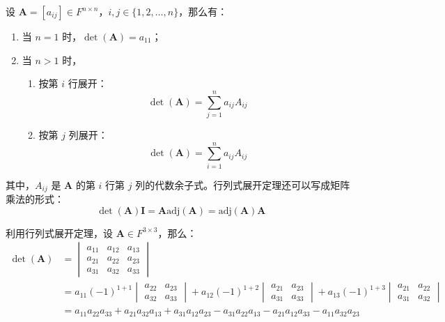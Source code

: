 \begin{theorem}[行列式展开定理]
    设 $\mathbf{A} = [a_{ij}] \in F^{n \times n}$，$i,j\in\{1,2,\ldots,n\}$，那么有：
    \begin{enumerate}
        \item 当 $n=1$ 时，$\det(\mathbf{A}) = a_{11}$；
        \item 当 $n>1$ 时，
        \begin{enumerate}
            \item 按第 $i$ 行展开：
            \[
                \det(\mathbf{A}) = \sum_{j=1}^{n} a_{ij} A_{ij}
            \]
            \item 按第 $j$ 列展开：
            \[
                \det(\mathbf{A}) = \sum_{i=1}^{n} a_{ij} A_{ij}
            \]
        \end{enumerate}
    \end{enumerate}
    其中，$A_{ij}$ 是 $\mathbf{A}$ 的第 $i$ 行第 $j$ 列的代数余子式。行列式展开定理还可以写成矩阵乘法的形式：
    \[
        \det(\mathbf{A}) \mathbf{I} = \mathbf{A}\mathrm{adj}(\mathbf{A})= \mathrm{adj}(\mathbf{A})\mathbf{A}
    \]
    \label{thm:determinant_expansion}
\end{theorem}

\begin{example}
    利用行列式展开定理，设 $\mathbf{A}\in F^{3\times 3}$，那么：
    \begin{align*}
        \det(\mathbf{A}) &= \begin{vmatrix}
            a_{11} & a_{12} & a_{13} \\
            a_{21} & a_{22} & a_{23} \\
            a_{31} & a_{32} & a_{33}
        \end{vmatrix}\\
        &= a_{11} (-1)^{1+1}\begin{vmatrix}
                a_{22} & a_{23} \\
                a_{32} & a_{33}
            \end{vmatrix} +
            a_{12} (-1)^{1+2}\begin{vmatrix}
                a_{21} & a_{23} \\
                a_{31} & a_{33}
            \end{vmatrix} +
            a_{13} (-1)^{1+3}\begin{vmatrix}
                a_{21} & a_{22} \\
                a_{31} & a_{32}
            \end{vmatrix}\\
        &= a_{11}a_{22}a_{33}+a_{21}a_{32}a_{13}+a_{31}a_{12}a_{23}-a_{31}a_{22}a_{13}-a_{21}a_{12}a_{33}-a_{11}a_{32}a_{23}
    \end{align*}
\end{example}

